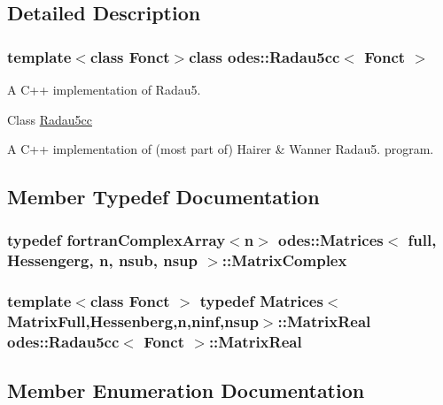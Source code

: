\subsection{Detailed Description}
\subsubsection*{template$<$class Fonct$>$class odes\+::\+Radau5cc$<$ Fonct $>$}

A C++ implementation of Radau5. 

Class \hyperlink{classodes_1_1Radau5cc}{Radau5cc}

A C++ implementation of (most part of) Hairer \& Wanner Radau5. program. 

\subsection{Member Typedef Documentation}
\hypertarget{classodes_1_1Matrices_aa1313b5ab7fdab6f5320c8d5aa3bfc24}{}
\subsubsection[{Matrix\+Complex}]{\setlength{\rightskip}{0pt plus 5cm}typedef {\bf fortran\+Complex\+Array}$<${\bf n}$>$ {\bf odes\+::\+Matrices}$<$ full, Hessengerg, {\bf n}, nsub, {\bf nsup} $>$\+::{\bf Matrix\+Complex}\hspace{0.3cm}{\ttfamily [inherited]}}\label{classodes_1_1Matrices_aa1313b5ab7fdab6f5320c8d5aa3bfc24}
\hypertarget{classodes_1_1Radau5cc_a8ef067b8852403d48d8528f601a4626a}{}
\subsubsection[{Matrix\+Real}]{\setlength{\rightskip}{0pt plus 5cm}template$<$class Fonct $>$ typedef {\bf Matrices}$<${\bf Matrix\+Full},{\bf Hessenberg},{\bf n},{\bf ninf},{\bf nsup}$>$\+::{\bf Matrix\+Real} {\bf odes\+::\+Radau5cc}$<$ Fonct $>$\+::{\bf Matrix\+Real}}\label{classodes_1_1Radau5cc_a8ef067b8852403d48d8528f601a4626a}


\subsection{Member Enumeration Documentation}
\hypertarget{classodes_1_1Radau5cc_a530d53d29f5c75bb20865fb786cd5f2d}{}
